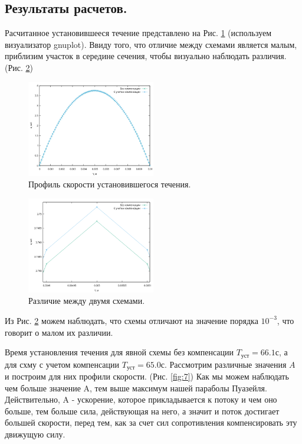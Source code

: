 \subsection{Результаты расчетов.}
Расчитанное установившееся течение представлено на Рис. \ref{fig:5} (используем визуализатор gnuplot).
Ввиду того, что отличие между схемами является малым, приблизим участок в середине сечения, чтобы визуально наблюдать различия. (Рис. \ref{fig:6})
\begin{figure}[H]
    \centering
    \includegraphics[width=0.5\textwidth]{images/5.png}
    \caption {Профиль скорости установившегося течения.}
    \label{fig:5}
\end{figure}

\begin{figure}[H]
    \centering
    \includegraphics[width=0.5\textwidth]{images/6.png}
    \caption {Различие между двумя схемами.}
    \label{fig:6}
\end{figure}

Из Рис. \ref{fig:6} можем наблюдать, что схемы отличают на значение порядка $10^{-3}$, что говорит о малом их различии.

Время установления течения для явной схемы без компенсации $T_\text{уст}=66.1 \text{с}$, а для схму с учетом компенсации $T_\text{уст}=65.0 \text{с}$. 
Рассмотрим различные значения $A$ и построим для них профили скорости. (Рис. \ref{fig:7}) Как мы можем наблюдать чем больше значение A, тем выше максимум нашей параболы Пуазейля. Действительно, A - ускорение, которое прикладывается к потоку и чем оно больше, тем больше сила, действующая на него, а значит и поток достигает большей скорости, перед тем, как за счет сил сопротивления компенсировать эту движущую силу. 

